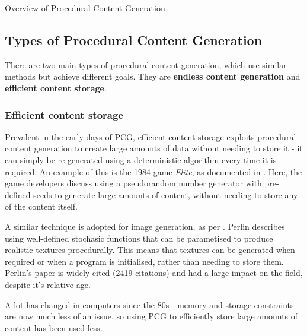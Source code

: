 \documentclass[review]{cmpreport}
\begin{document}
\begin{section}{Overview of Procedural Content Generation}
\subsection{Types of Procedural Content Generation}
There are two main types of procedural content generation, which use similar methods but achieve different goals. They are \textbf{endless content generation} and \textbf{efficient content storage}.

\subsubsection{Efficient content storage}
Prevalent in the early days of PCG, efficient content storage exploits procedural content generation to create large amounts of data without needing to store it - it can simply be re-generated using a deterministic algorithm every time it is required. An example of this is the 1984 game \textit{Elite}, as documented in \citet{spufford_2003}. Here, the game developers discuss using a pseudorandom number generator with pre-defined seeds to generate large amounts of content, without needing to store any of the content itself. \par
A similar technique is adopted for image generation, as per \cite{Perlin:1985:IS:325165.325247}. Perlin describes using well-defined stochasic functions that can be parametised to produce realistic textures procedurally. This means that textures can be generated when required or when a program is initialised, rather than needing to store them. Perlin's paper is widely cited (2419 citations) and had a large impact on the field, despite it's relative age.\par
A lot has changed in computers since the 80s - memory and storage constraints are now much less of an issue, so using PCG to efficiently store large amounts of content has been used less.


\end{section}
\end{document}
